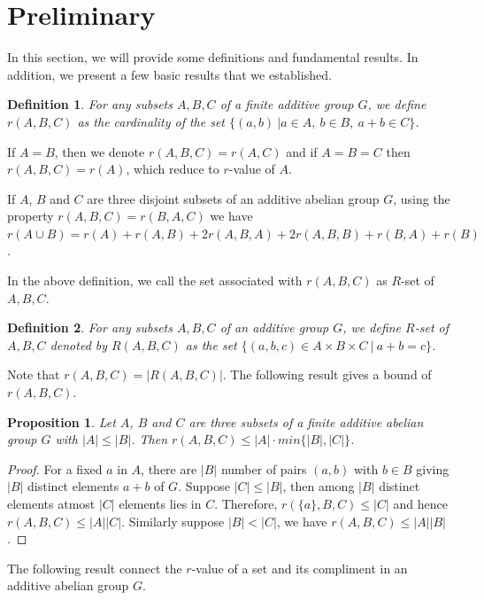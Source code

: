 \documentclass[12pt,a4paper]{article}
\newtheorem{definition}{Definition}[section]
\newtheorem{prop}{Proposition}[section]
\begin{document}
	\section{Preliminary}\label{preliminary}
	In this section, we will provide some definitions and fundamental results. In addition, we present a few basic results that we established.
	
	\begin{definition}\label{D2}
		\cite{Nithish} For any subsets $ A,B,C$ of a finite additive group $ G $, we define $ r(A,B,C) $ as the cardinality of the set $ \{(a,b)~|a\in A,~b\in B,~a+b\in C\} $.
	\end{definition}
	If $ A=B $, then we denote $ r(A,B,C)=r(A,C) $ and if $ A=B=C $ then $ r(A,B,C)=r(A) $, which reduce to $ r $-value of $ A $. 
	
	\par If $A$, $B$ and $C$ are three disjoint subsets of an additive abelian group $G$, using  the property $r(A,B,C)=r(B,A,C)$ we have $r(A\cup B)=r(A)+r(A,B)+2r(A,B,A)+2r(A,B,B)+r(B,A)+r(B)$.
	
	In the above definition, we call the set associated with $ r(A,B,C) $ as $R$-set of $A,B,C$. 
	\begin{definition}\label{D1}
		For any subsets $ A,B,C$ of an additive group $ G $, we define $R$-set of $A,B,C$ denoted by $R(A,B,C)$ as the set $\{(a,b,c)\in A\times B\times C~|~a+b=c\} $.
	\end{definition}
	Note that $ r(A,B,C) =|R(A,B,C)|$. The following result gives a bound of $ r(A,B,C)$.
	
	\begin{prop}
		Let $A$, $B$ and $C$ are three subsets of a finite additive abelian group $G$ with $|A|\leq|B|$. Then $r(A,B,C)\leq|A|\cdot min\{|B|,|C|\}$.
	\end{prop}
	\begin{proof}
		For a fixed $a$ in $A$, there are $|B|$ number of pairs $(a,b)$ with $b\in B$ giving $|B|$ distinct elements $a+b$ of $G$. Suppose $|C|\leq|B|$, then among $|B|$ distinct elements atmost $|C|$ elements lies in $C$. Therefore, $r(\{a\},B,C)\leq|C|$ and hence $r(A,B,C)\leq|A||C|$. Similarly suppose $|B|<|C|$, we have $r(A,B,C)\leq|A||B|$.
	\end{proof}
	
	The following result connect the $r$-value of a set and its compliment in an additive abelian group $G$.
	
\end{document}

